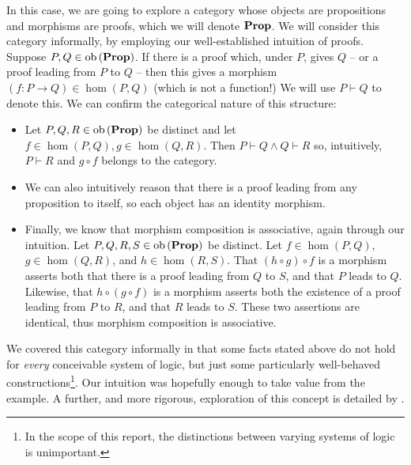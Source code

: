In this case, we are going to explore a category whose objects are propositions
and morphisms are proofs, which we will denote $\operatorname{\mathbf{Prop}}$. We will consider this
category informally, by employing our well-established intuition of proofs.
Suppose $P, Q \in \operatorname{ob}{(\operatorname{\mathbf{Prop}})}$. If there is a proof which, under $P$,
gives $Q$ -- or a proof leading from $P$ to $Q$ -- then this gives a morphism
$(f \colon P \to Q) \in \hom (P, Q)$ (which is not a function!) We will use $P
\vdash Q$ to denote this. We can confirm the categorical nature of this
structure:
\begin{itemize}
        \item Let $P, Q, R \in \operatorname{ob}{(\operatorname{\mathbf{Prop}})}$ be distinct and let
                $f \in \hom (P, Q), g \in \hom (Q, R)$. Then $P \vdash Q \land
                Q \vdash R$ so, intuitively, $P \vdash R$ and $g \circ f$ belongs
                to the category.
        \item We can also intuitively reason that there is a proof leading from
                any proposition to itself, so each object has an identity
                morphism.
        \item Finally, we know that morphism composition is associative, again
                through our intuition. Let $P, Q, R, S \in \operatorname{ob}{(\operatorname{\mathbf{Prop}})}$
                be distinct. Let $f \in \hom (P, Q)$, $g \in \hom (Q, R)$, and
                $h \in \hom (R, S)$. That $(h \circ g) \circ f$ is a morphism
                asserts both that there is a proof leading from $Q$ to $S$, and
                that $P$ leads to $Q$. Likewise, that $h \circ (g \circ f)$ is a
                morphism asserts both the existence of a proof leading from $P$
                to $R$, and that $R$ leads to $S$. These two assertions are
                identical, thus morphism composition is associative.
\end{itemize}
We covered this category informally in that some facts stated above do not hold
for \emph{every} conceivable system of logic, but just some particularly
well-behaved constructions\footnote{In the scope of this report, the
distinctions between varying systems of logic is unimportant.}. Our intuition
was hopefully enough to take value from the example. A further, and more
rigorous, exploration of this concept is detailed by \autocite{Baez:2009}.
%
